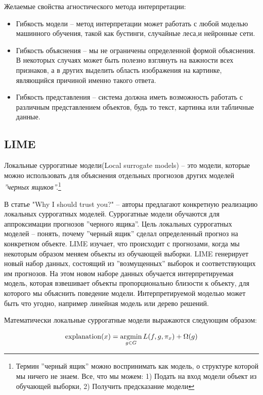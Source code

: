 \documentclass[12pt]{article}
\newcommand{\argmin}{\mathop{\rm argmin}\limits}
\newcommand{\explanation}{\mathop{\rm explanation}\limits}
\begin{document}
\vspace{10pt}
\noindent
Желаемые свойства агностического метода интерпретации:
\begin{itemize}
    \item Гибкость модели -- метод интерпретации может работать с любой моделью машинного обучения,
    такой как бустинги, случайные леса,и нейронные сети.
    \item Гибкость объяснения -- мы не ограничены определенной формой объяснения. В некоторых случаях может 
быть полезно взглянуть на важности всех признаков, а в других выделить область изображения на картинке,
являющийся причиной именно такого ответа.
    \item Гибкость представления -- система должна иметь возможность работать с различным
    представлением объектов, будь то текст, картинка или табличные данные.
\end{itemize}

\subsection{LIME}
Локальные суррогатные модели(Local surrogate models) -- это модели, которые можно использовать
для объяснения отдельных прогнозов других моделей \textit{''черных ящиков''.}\footnote{Термин
''черный ящик'' можно воспринимать как модель, о структуре которой мы ничего не знаем. Все, что 
мы можем: 1) Подать на вход модели объект из обучающей выборки, 2) Получить предсказание модели}

В статье "Why I should trust you?"\cite{Lime} -- авторы предлагают конкретную реализацию локальных суррогатных моделей.
Суррогатные модели обучаются для аппроксимации прогнозов ''черного
ящика''. Цель локальных суррогатных моделей -- понять, почему ''черный ящик'' сделал определенный прогноз на конкретном объекте. 
LIME изучает, что происходит с прогнозами, когда мы некоторым образом меняем объекты из обучающей выборки.
LIME генерирует новый набор данных, состоящий из ''возмущенных'' выборок и соответствующих им прогнозов.
На этом новом наборе данных обучается интерпретируемая модель, 
которая взвешивает объекты пропорционально близости к объекту, для которого мы объяснить поведение модели. 
Интерпретируемой моделью может быть что угодно, например линейная модель или дерево решений. 

\vspace{10pt}
\noindent
Математически локальные суррогатные модели выражаются следующим образом:

$$\explanation(x) = \argmin\limits_{g \in G}L(f, g, \pi_x) + \Omega(g)$$
\end{document}
